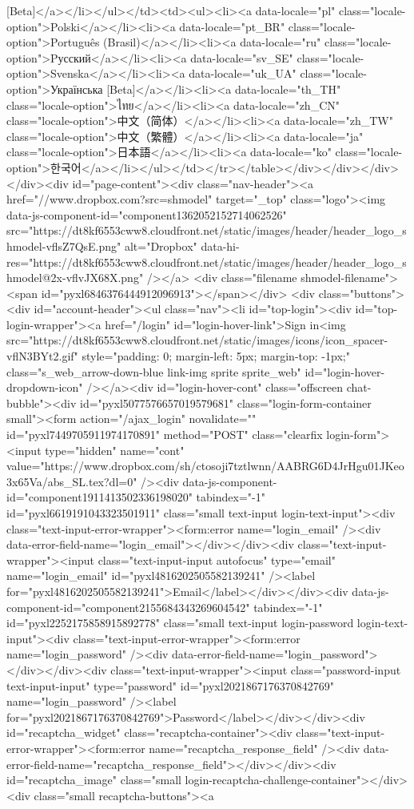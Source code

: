 {[Beta]</a></li></ul></td><td><ul><li><a data-locale="pl" class="locale-option">Polski</a></li><li><a data-locale="pt_BR" class="locale-option">Português (Brasil)</a></li><li><a data-locale="ru" class="locale-option">Pусский</a></li><li><a data-locale="sv_SE" class="locale-option">Svenska</a></li><li><a data-locale="uk_UA" class="locale-option">Українська [Beta]</a></li><li><a data-locale="th_TH" class="locale-option">ไทย</a></li><li><a data-locale="zh_CN" class="locale-option">中文（简体）</a></li><li><a data-locale="zh_TW" class="locale-option">中文（繁體）</a></li><li><a data-locale="ja" class="locale-option">日本語</a></li><li><a data-locale="ko" class="locale-option">한국어</a></li></ul></td></tr></table></div></div></div></div><div id="page-content"><div class="nav-header"><a href="//www.dropbox.com?src=shmodel" target="_top" class="logo"><img data-js-component-id="component1362052152714062526" src="https://dt8kf6553cww8.cloudfront.net/static/images/header/header_logo_shmodel-vflsZ7QsE.png" alt="Dropbox" data-hi-res="https://dt8kf6553cww8.cloudfront.net/static/images/header/header_logo_shmodel@2x-vflvJX68X.png" /></a> <div class="filename shmodel-filename"><span id="pyxl6846376444912096913"></span></div> <div class="buttons"> <div id="account-header"><ul class="nav"><li id="top-login"><div id="top-login-wrapper"><a href="/login" id="login-hover-link">Sign in<img src="https://dt8kf6553cww8.cloudfront.net/static/images/icons/icon_spacer-vflN3BYt2.gif" style="padding: 0; margin-left: 5px; margin-top: -1px;" class="s_web_arrow-down-blue link-img sprite sprite_web" id="login-hover-dropdown-icon" /></a><div id="login-hover-cont" class="offscreen chat-bubble"><div id="pyxl5077576657019579681" class="login-form-container  small"><form action="/ajax_login" novalidate="" id="pyxl7449705911974170891" method="POST" class="clearfix login-form"><input type="hidden" name="cont" value="https://www.dropbox.com/sh/ctosoji7tztlwnn/AABRG6D4JrHgu01JKeo3x65Va/abs_SL.tex?dl=0" /><div data-js-component-id="component1911413502336198020" tabindex="-1" id="pyxl6619191043323501911" class="small text-input login-text-input"><div class="text-input-error-wrapper"><form:error name="login_email" /><div data-error-field-name="login_email"></div></div><div class="text-input-wrapper"><input class="text-input-input autofocus" type="email" name="login_email" id="pyxl4816202505582139241" /><label for="pyxl4816202505582139241">Email</label></div></div><div data-js-component-id="component2155684343269604542" tabindex="-1" id="pyxl2252175858915892778" class="small text-input login-password login-text-input"><div class="text-input-error-wrapper"><form:error name="login_password" /><div data-error-field-name="login_password"></div></div><div class="text-input-wrapper"><input class="password-input text-input-input" type="password" id="pyxl2021867176370842769" name="login_password" /><label for="pyxl2021867176370842769">Password</label></div></div><div id="recaptcha_widget" class="recaptcha-container"><div class="text-input-error-wrapper"><form:error name="recaptcha_response_field" /><div data-error-field-name="recaptcha_response_field"></div></div><div id="recaptcha_image" class="small login-recaptcha-challenge-container"></div><div class="small recaptcha-buttons"><a }
